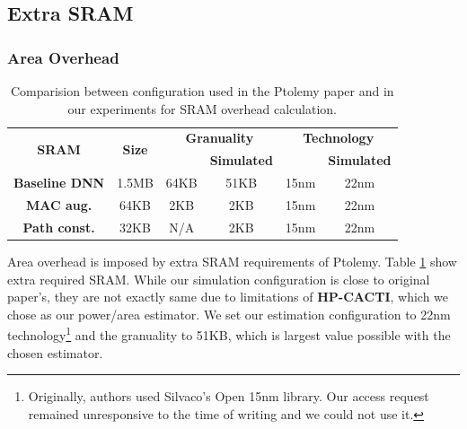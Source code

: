 \documentclass[11pt]{article}
\begin{document}
\subsection{Extra SRAM}
\subsubsection{Area Overhead \label{sec:sram-area}}
\begin{table}[H]
    \centering
    \begin{tabular}{cccccc}
    \toprule
    \multirow{2}{*}{\textbf{SRAM}} & \multirow{2}{*}{\textbf{Size}} & \multicolumn{2}{c}{\textbf{Granuality}} & \multicolumn{2}{c}{\textbf{Technology}} \\ \cline{3-6} 
     &  & \textbf{\citet{ptolemy}} & \textbf{Simulated} & \textbf{\citet{ptolemy}} & \textbf{Simulated} \\ \hline
    \textbf{Baseline DNN} & 1.5MB & 64KB & 51KB & 15nm & 22nm \\ \hline
    \textbf{MAC aug.} & 64KB & 2KB & 2KB & 15nm & 22nm \\ 
    \textbf{Path const.} & 32KB & N/A & 2KB & 15nm & 22nm \\ \bottomrule
    \end{tabular}
    \caption{Comparision between configuration used in the Ptolemy paper and in our experiments for SRAM overhead calculation.\label{tab:sram}}
\end{table}

Area overhead is imposed by extra SRAM requirements of Ptolemy. Table \ref{tab:sram} show extra required SRAM. While our simulation configuration is close to original paper's, they are not exactly same due to limitations of \textbf{HP-CACTI}, which we chose as our power/area estimator. We set our estimation configuration to 22nm technology\footnote{Originally, authors used Silvaco's Open 15nm library. Our access request remained unresponsive to the time of writing and we could not use it.} and the granuality to 51KB, which is largest value possible with the chosen estimator.
\end{document}
